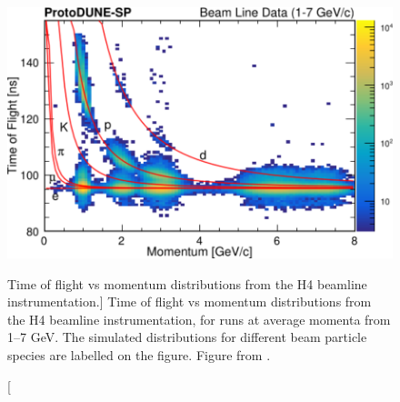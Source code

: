 \begin{figure}

	\centering

	\includegraphics[width=\textwidth]{figures/h4_tof.pdf}

	\caption
	[Time of flight vs momentum distributions from the H4 beamline
	instrumentation.]
	{Time of flight vs momentum distributions from the H4 beamline
	instrumentation, for \protodune{} runs at average momenta from 1--7 GeV. The
	simulated distributions for different beam particle species are labelled on
	the figure. Figure from \cite{protoduneperf}.}

	\label{fig:h4_tof}

\end{figure}


